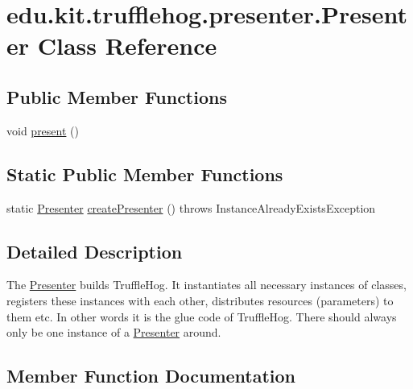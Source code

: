 \hypertarget{classedu_1_1kit_1_1trufflehog_1_1presenter_1_1_presenter}{}\section{edu.\+kit.\+trufflehog.\+presenter.\+Presenter Class Reference}
\label{classedu_1_1kit_1_1trufflehog_1_1presenter_1_1_presenter}
\subsection*{Public Member Functions}
\begin{DoxyCompactItemize}
\item 
void \hyperlink{classedu_1_1kit_1_1trufflehog_1_1presenter_1_1_presenter_a053127570d49e53f61750d2901b85cea}{present} ()
\end{DoxyCompactItemize}
\subsection*{Static Public Member Functions}
\begin{DoxyCompactItemize}
\item 
static \hyperlink{classedu_1_1kit_1_1trufflehog_1_1presenter_1_1_presenter}{Presenter} \hyperlink{classedu_1_1kit_1_1trufflehog_1_1presenter_1_1_presenter_af177bd2bd35c1942ec831eacde8c4dca}{create\+Presenter} ()  throws Instance\+Already\+Exists\+Exception 
\end{DoxyCompactItemize}


\subsection{Detailed Description}
The \hyperlink{classedu_1_1kit_1_1trufflehog_1_1presenter_1_1_presenter}{Presenter} builds Truffle\+Hog. It instantiates all necessary instances of classes, registers these instances with each other, distributes resources (parameters) to them etc. In other words it is the glue code of Truffle\+Hog. There should always only be one instance of a \hyperlink{classedu_1_1kit_1_1trufflehog_1_1presenter_1_1_presenter}{Presenter} around. 

\subsection{Member Function Documentation}
\hypertarget{classedu_1_1kit_1_1trufflehog_1_1presenter_1_1_presenter_af177bd2bd35c1942ec831eacde8c4dca}{}
